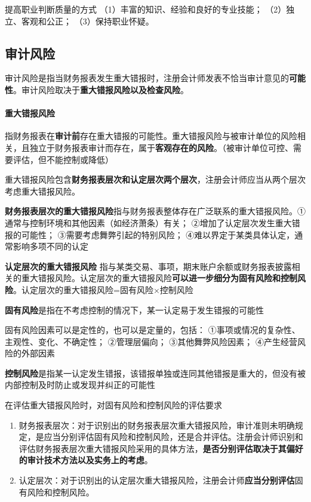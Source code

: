 \documentclass[UTF8,12pt]{ctexart}
\numberwithin{equation}{section} %
\numberwithin{figure}{section}
\numberwithin{table}{section}
\begin{document}
	提高职业判断质量的方式
	（1）丰富的知识、经验和良好的专业技能；
	（2）独立、客观和公正；
	（3）保持职业怀疑。

	\subsection{审计风险}
	审计风险是指当财务报表发生重大错报时，注册会计师发表不恰当审计意见的\textbf{可能性}。审计风险取决于\textbf{重大错报风险以及检查风险}。
	
	\paragraph{重大错报风险}
	指财务报表在\textbf{审计前}存在重大错报的可能性。重大错报风险与被审计单位的风险相关，且独立于财务报表审计而存在，属于\textbf{客观存在的风险}。（被审计单位可控、需要评估，但不能控制或降低）
	
	重大错报风险包含\textbf{财务报表层次和认定层次两个层次}，注册会计师应当从两个层次考虑重大错报风险。
	
	\textbf{财务报表层次的重大错报风险}指与财务报表整体存在广泛联系的重大错报风险。①通常与控制环境和其他因素（如经济萧条）有关；
	②增加了认定层次发生重大错报的可能性；
	③需要考虑舞弊引起的特别风险；
	④难以界定于某类具体认定，通常影响多项不同的认定
	
	\textbf{认定层次的重大错报风险}
	指与某类交易、事项，期末账户余额或财务报表披露相关的重大错报风险。认定层次的重大错报风险\textbf{可以进一步细分为固有风险和控制风险}。认定层次的重大错报风险=固有风险×控制风险
	
	\textbf{固有风险}是指在不考虑控制的情况下，某一认定易于发生错报的可能性
	
	固有风险因素可以是定性的，也可以是定量的，包括：
	①事项或情况的复杂性、主观性、变化、不确定性；
	②管理层偏向；
	③其他舞弊风险因素；
	④产生经营风险的外部因素
	
	\textbf{控制风险}是指某一认定发生错报，该错报单独或连同其他错报是重大的，但没有被内部控制及时防止或发现并纠正的可能性
	
	
	在评估重大错报风险时，对固有风险和控制风险的评估要求
	\begin{enumerate}
		\item 财务报表层次：对于识别出的财务报表层次重大错报风险，审计准则未明确规定，是应当分别评估固有风险和控制风险，还是合并评估。注册会计师识别和评估财务报表层次重大错报风险采用的具体方法，\textbf{是否分别评估取决于其偏好的审计技术方法以及实务上的考虑}。
		
		\item 认定层次：对于识别出的认定层次重大错报风险，注册会计师\textbf{应当分别评估}固有风险和控制风险。
		
	\end{enumerate}
	
\end{document}

